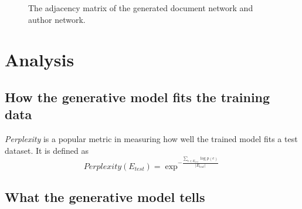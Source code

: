 \documentclass[letterpaper]{article}
\begin{document}
\begin{figure}
\caption{The adjacency matrix of the generated document network and author network.}
\label{fig:gene_ad_mat}
\end{figure}

\section{Analysis}

\subsection{How the generative model fits the training data}

\emph{Perplexity} is a popular metric in measuring how well the trained model fits a test dataset.
It is defined as 
\begin{equation}
Perplexity( E_{test} ) = \exp^{- \frac{ \sum_{e \in E_{test}} \log p(e) }{ | E_{test} | } }
\end{equation}

\subsection{What the generative model tells}
\end{document}
